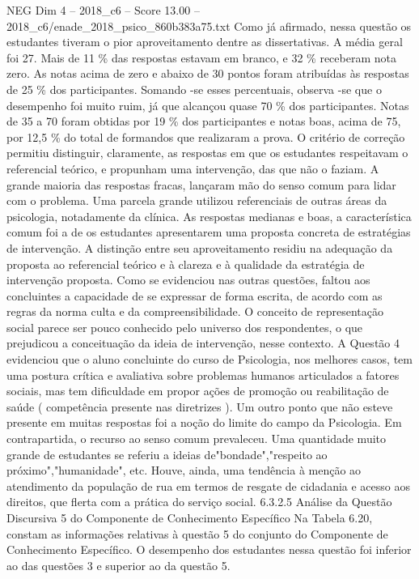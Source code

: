 \begin{textsample}{NEG Dim 4 – 2018\_c6 – Score 13.00 – 2018\_c6/enade\_2018\_psico\_860b383a75.txt}
Como já afirmado, nessa questão os estudantes tiveram o pior aproveitamento dentre as dissertativas.
A média geral foi 27.
Mais de 11 \% das respostas estavam em branco, e 32 \% receberam nota zero.
As notas acima de zero e abaixo de 30 pontos foram atribuídas às respostas de 25 \% dos participantes.
Somando -se esses percentuais, observa -se que o desempenho foi muito ruim, já que alcançou quase 70 \% dos participantes.
Notas de 35 a 70 foram obtidas por 19 \% dos participantes e notas boas, acima de 75, por 12,5 \% do total de formandos que realizaram a prova.
O critério de correção permitiu distinguir, claramente, as respostas em que os estudantes respeitavam o referencial teórico, e propunham uma intervenção, das que não o faziam.
A grande maioria das respostas fracas, lançaram mão do senso comum para lidar com o problema.
Uma parcela grande utilizou referenciais de outras áreas da psicologia, notadamente da clínica.
As respostas medianas e boas, a característica comum foi a de os estudantes apresentarem uma proposta concreta de estratégias de intervenção.
A distinção entre seu aproveitamento residiu na adequação da proposta ao referencial teórico e à clareza e à qualidade da estratégia de intervenção proposta.
Como se evidenciou nas outras questões, faltou aos concluintes a capacidade de se expressar de forma escrita, de acordo com as regras da norma culta e da compreensibilidade.
O conceito de representação social parece ser pouco conhecido pelo universo dos respondentes, o que prejudicou a conceituação da ideia de intervenção, nesse contexto.
A Questão 4 evidenciou que o aluno concluinte do curso de Psicologia, nos melhores casos, tem uma postura crítica e avaliativa sobre problemas humanos articulados a fatores sociais, mas tem dificuldade em propor ações de promoção ou reabilitação de saúde ( competência presente nas diretrizes ).
Um outro ponto que não esteve presente em muitas respostas foi a noção do limite do campo da Psicologia.
Em contrapartida, o recurso ao senso comum prevaleceu.
Uma quantidade muito grande de estudantes se referiu a ideias de"bondade","respeito ao próximo","humanidade", etc.
Houve, ainda, uma tendência à menção ao atendimento da população de rua em termos de resgate de cidadania e acesso aos direitos, que flerta com a prática do serviço social. 6.3.2.5 Análise da Questão Discursiva 5 do Componente de Conhecimento Específico Na Tabela 6.20, constam as informações relativas à questão 5 do conjunto do Componente de Conhecimento Específico.
O desempenho dos estudantes nessa questão foi inferior ao das questões 3 e superior ao da questão 5.

\end{textsample}
